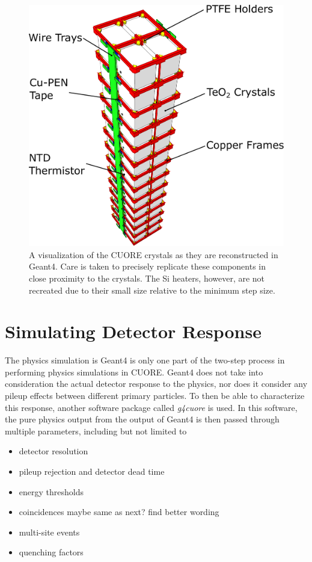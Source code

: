 \begin{figure}[htbp]
    \centering
    \includegraphics[height=0.3\paperheight]{Figures/Crystals_rotated_labelled.pdf}
    \caption[A visualization of the CUORE crystals as they are reconstructed in Geant4.]
    {A visualization of the CUORE crystals as they are reconstructed in Geant4.
    Care is taken to precisely replicate these components in close proximity to the crystals.
    The Si heaters, however, are not recreated due to their small size relative to the minimum step size.}
    \label{fig:CUORE_crystals_MC}
\end{figure}

\section{Simulating Detector Response}
The physics simulation is Geant4 is only one part of the two-step process in performing physics simulations in CUORE.
Geant4 does not take into consideration the actual detector response to the physics, nor does it consider any pileup effects between different primary particles.
To then be able to characterize this response, another software package called \textit{g4cuore} is used.
In this software, the pure physics output from the output of Geant4 is then passed through multiple parameters, including but not limited to
\begin{itemize}
    \item detector resolution
    \item pileup rejection and detector dead time
    \item energy thresholds
    \item coincidences \color{red} maybe same as next? find better wording \color{black}
    \item multi-site events
    \item quenching factors
\end{itemize}

